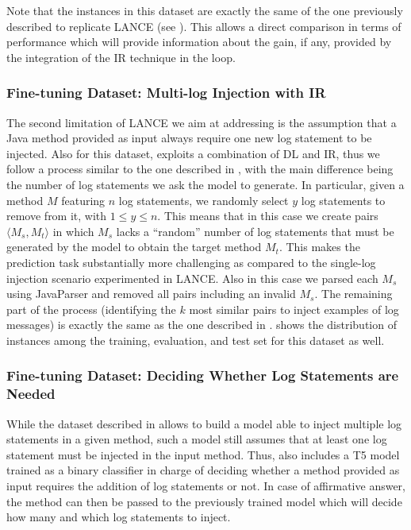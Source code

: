 Note that the instances in this dataset are exactly the same of the one previously described to replicate LANCE (see ). This allows a direct comparison in terms of performance which will provide information about the gain, if any, provided by the integration of the IR technique in the loop.


\subsubsection{Fine-tuning Dataset: Multi-log Injection with IR} \label{sec:multi-log-dataset}

The second limitation of LANCE \cite{mastropaolo2022using} we aim at addressing is the assumption that a Java method provided as input always require one new log statement to be injected. Also for this dataset, \approach exploits a combination of DL and IR, thus we follow a process similar to the one described in , with the main difference being the number of log statements we ask the model to generate. In particular, given a method $M$ featuring $n$ log statements, we randomly select $y$ log statements to remove from it, with $1 \leq y \leq n$. This means that in this case we create pairs $\langle M_s, M_t \rangle$ in which $M_s$ lacks a ``random'' number of log statements that must be generated by the model to obtain the target method $M_t$. This makes the prediction task substantially more challenging as compared to the single-log injection scenario experimented in LANCE. Also in this case we parsed each $M_s$ using JavaParser \cite{javaparser} and removed all pairs including an invalid $M_s$. The remaining part of the process (\ie identifying the $k$ most similar pairs to inject examples of log messages) is exactly the same as the one described in .  shows the distribution of instances among the training, evaluation, and test set for this dataset as well.


\subsubsection{Fine-tuning Dataset: Deciding Whether Log Statements are Needed} \label{sec:predicting-dataset}

While the dataset described in  allows to build a model able to inject multiple log statements in a given \java method, such a model still assumes that at least one log statement must be injected in the input method. Thus, \approach also includes a T5 model trained as a binary classifier in charge of deciding whether a method provided as input requires the addition of log statements or not. In case of affirmative answer, the method can then be passed to the previously trained model which will decide how many and which log statements to inject.

